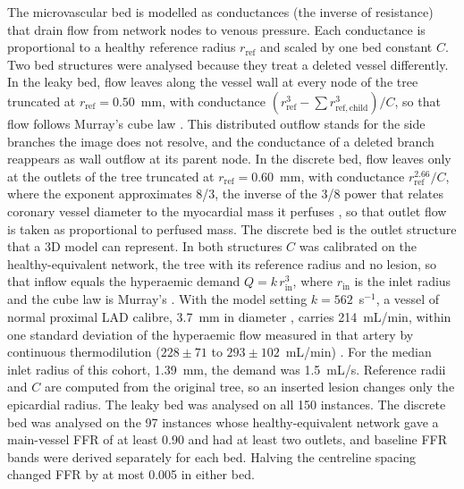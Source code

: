 \documentclass[journal]{IEEEtran}
\begin{document}
The microvascular bed is modelled as conductances (the inverse of resistance) that drain flow from network nodes to
venous pressure. Each conductance is proportional to a healthy reference radius $r_\mathrm{ref}$ and scaled by one
bed constant $C$. Two bed structures were analysed because they treat a deleted vessel differently. In the leaky
bed, flow leaves along the vessel wall at every node of the tree truncated at $r_\mathrm{ref} = 0.50$~mm, with
conductance $(r_\mathrm{ref}^3 - \sum r_{\mathrm{ref},\mathrm{child}}^3)/C$, so that flow follows Murray's cube law
\cite{murray1926}. This distributed outflow stands for the side branches the image does not resolve, and the
conductance of a deleted branch reappears as wall outflow at its parent node. In the discrete bed, flow leaves only
at the outlets of the tree truncated at $r_\mathrm{ref} = 0.60$~mm, with conductance $r_\mathrm{ref}^{2.66}/C$,
where the exponent approximates 8/3, the inverse of the 3/8 power that relates coronary vessel diameter to the
myocardial mass it perfuses \cite{choy2008}, so that outlet flow is taken as proportional to perfused mass. The discrete bed is the outlet structure that a 3D model can
represent. In both structures $C$ was calibrated on the healthy-equivalent network, the tree with its reference
radius and no lesion, so that inflow equals the hyperaemic demand $Q = k\,r_\mathrm{in}^3$, where $r_\mathrm{in}$ is
the inlet radius and the cube law is Murray's \cite{murray1926}. With the model setting $k = 562$~s$^{-1}$, a
vessel of normal proximal LAD calibre, 3.7~mm in diameter \cite{dodge1992}, carries 214~mL/min,
within one standard deviation of the hyperaemic flow measured in that artery by continuous thermodilution
($228 \pm 71$ to $293 \pm 102$~mL/min) \cite{fournier2021}. For the median inlet radius of this cohort, 1.39~mm, the
demand was 1.5~mL/s. Reference radii and $C$ are computed from the original tree, so an inserted lesion changes
only the epicardial radius. The leaky bed was analysed on all 150 instances. The discrete bed was analysed on the
97 instances whose healthy-equivalent network gave a main-vessel FFR of at least 0.90 and had at least two outlets,
and baseline FFR bands were derived separately for each bed. Halving the centreline spacing changed FFR by at most
0.005 in either bed.
\end{document}
